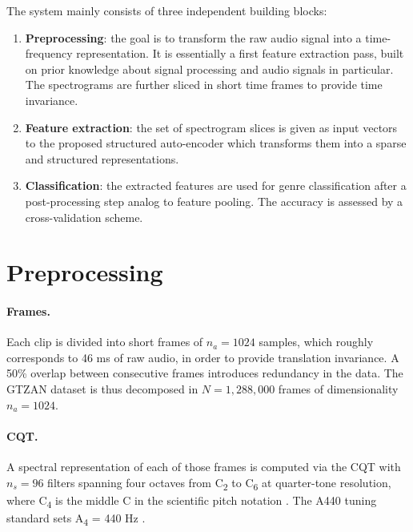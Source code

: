 The system mainly consists of three independent building blocks:
\begin{enumerate}
	\item \textbf{Preprocessing}: the goal is to transform the raw audio signal into a time-frequency representation. It is essentially a first feature extraction pass, built on prior knowledge about signal processing and audio signals in particular. The spectrograms are further sliced in short time frames to provide time invariance.
	\item \textbf{Feature extraction}: the set of spectrogram slices is given as input vectors to the proposed structured auto-encoder which transforms them into a sparse and structured representations.
	\item \textbf{Classification}: the extracted features are used for genre classification after a post-processing step analog to feature pooling. The accuracy is assessed by a cross-validation scheme.
\end{enumerate}

\section{Preprocessing} \label{sec:preprocessing}

\paragraph{Frames.}
Each clip is divided into short frames of $n_a = 1024$ samples, which roughly corresponds to 46 ms of raw audio, in order to provide translation invariance. A 50\% overlap between consecutive frames introduces redundancy in the data. The GTZAN dataset is thus decomposed in $N=1,288,000$ frames of dimensionality $n_a = 1024$.

\paragraph{\gls{CQT}.}
A spectral representation of each of those frames is computed via the \gls{CQT} with $n_s=96$ filters spanning four octaves from C\textsubscript{2} to C\textsubscript{6} at quarter-tone resolution, where C\textsubscript{4} is the middle C in the scientific pitch notation \cite{young1939ScientificPitch}. The A440 tuning standard sets A\textsubscript{4} = 440 Hz \cite{A440std}.

